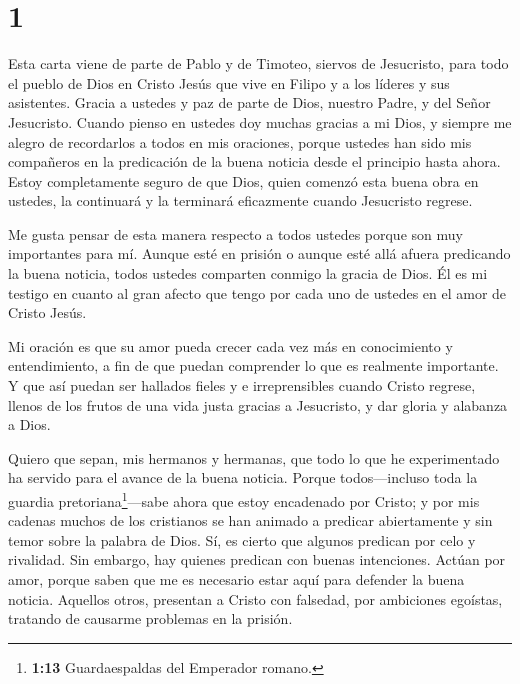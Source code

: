 \hypertarget{section}{%
\section{1}\label{section}}

 Esta carta viene de parte de Pablo y de Timoteo, siervos de
Jesucristo, para todo el pueblo de Dios en Cristo Jesús que vive en
Filipo y a los líderes y sus asistentes.  Gracia a ustedes y
paz de parte de Dios, nuestro Padre, y del Señor Jesucristo.
 Cuando pienso en ustedes doy muchas gracias a mi Dios,
 y siempre me alegro de recordarlos a todos en mis
oraciones,  porque ustedes han sido mis compañeros en la
predicación de la buena noticia desde el principio hasta ahora.
 Estoy completamente seguro de que Dios, quien comenzó esta
buena obra en ustedes, la continuará y la terminará eficazmente cuando
Jesucristo regrese.

 Me gusta pensar de esta manera respecto a todos ustedes
porque son muy importantes para mí. Aunque esté en prisión o aunque esté
allá afuera predicando la buena noticia, todos ustedes comparten conmigo
la gracia de Dios.  Él es mi testigo en cuanto al gran
afecto que tengo por cada uno de ustedes en el amor de Cristo Jesús.

 Mi oración es que su amor pueda crecer cada vez más en
conocimiento y entendimiento,  a fin de que puedan
comprender lo que es realmente importante. Y que así puedan ser hallados
fieles y e irreprensibles cuando Cristo regrese,  llenos de
los frutos de una vida justa gracias a Jesucristo, y dar gloria y
alabanza a Dios.

 Quiero que sepan, mis hermanos y hermanas, que todo lo que
he experimentado ha servido para el avance de la buena noticia.
 Porque todos---incluso toda la guardia
pretoriana\footnote{\textbf{1:13} Guardaespaldas del Emperador romano.}---sabe
ahora que estoy encadenado por Cristo;  y por mis cadenas
muchos de los cristianos se han animado a predicar abiertamente y sin
temor sobre la palabra de Dios.  Sí, es cierto que algunos
predican por celo y rivalidad. Sin embargo, hay quienes predican con
buenas intenciones.  Actúan por amor, porque saben que me
es necesario estar aquí para defender la buena noticia. 
Aquellos otros, presentan a Cristo con falsedad, por ambiciones
egoístas, tratando de causarme problemas en la prisión.

